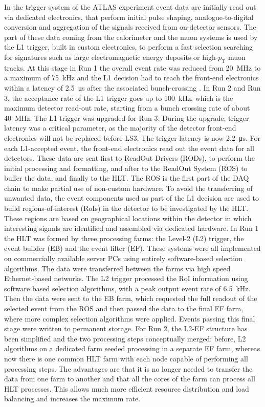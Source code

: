 In the trigger system of the ATLAS experiment event data are initially read out via dedicated electronics, that perform initial pulse shaping, analogue-to-digital conversion and aggregation of the signals received from on-detector sensors.
The part of these data coming from the calorimeter and the muon systems is used by the L1 trigger, built in custom electronics, to perform a fast selection searching for signatures such as large electromagnetic energy deposits or high-$p_\mathrm{T}$ muon tracks.
At this stage in Run 1 the overall event rate was reduced from \SI{20}{\mega\hertz} to a maximum of \SI{75}{\kilo\hertz} and the L1 decision had to reach the front-end electronics within a latency of \SI{2.5}{\micro\second} after the associated bunch-crossing \cite{PanduroVazquez:1954156}. In Run 2 and Run 3, the acceptance rate of the L1 trigger goes up to \SI{100}{\kilo\hertz}, which is the maximum detector read-out rate, starting from a bunch crossing rate of about \SI{40}{\mega\hertz}. The L1 trigger was upgraded for Run 3. During the upgrade, trigger latency was a critical parameter, as the majority of the detector front-end electronics will not be replaced before LS3. The trigger latency is now \SI{2.2}{\micro\second}.
For each L1-accepted event, the front-end electronics read out the event data for all detectors. These data are sent first to ReadOut Drivers (RODs), to perform the initial processing and formatting, and after to the ReadOut System (ROS) to buffer the data, and finally to the HLT. The ROS is the first part of the DAQ chain to make partial use of non-custom hardware.
To avoid the transferring of unwanted data, the event components used as part of the L1 decision are used to build regions-of-interest (RoIs) in the detector to be investigated by the HLT. These regions are based on geographical locations within the detector in which interesting signals are identified and assembled via dedicated hardware. 
In Run 1 the HLT was formed by three processing farms: the Level-2 (L2) trigger, the event builder (EB) and the event filter (EF). These systems were all implemented on commercially available server PCs using entirely software-based selection algorithms. The data were transferred between the farms via high speed Ethernet-based networks.
The L2 trigger processed the RoI information using software based selection algorithms, with a peak output event rate of \SI{6.5}{\kilo\hertz}. Then the data were sent to the EB farm, which requested the full readout of the selected event from the ROS and then passed the data to the final EF farm, where more complex selection algorithms were applied. Events passing this final stage were written to permanent storage. For Run 2, the L2-EF structure has been simplified and the two processing steps conceptually merged: before, L2 algorithms on a dedicated farm seeded processing in a separate EF farm, whereas now there is one common HLT farm with each node capable of performing all processing steps. The advantages are that it is no longer needed to transfer the data from one farm to another and that all the cores of the farm can process all HLT processes. This allows much more efficient resource distribution and load balancing and increases the maximum rate.
